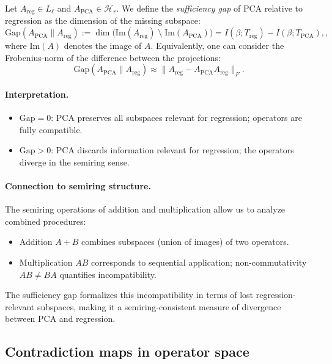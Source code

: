 \begin{defn}  
Let $A_{\text{reg}} \in L_\ell$ and $A_{\text{PCA}} \in \mathcal{H}_r$. 
We define the \emph{sufficiency gap} of PCA relative to regression as the dimension of the missing subspace:
\[
\text{Gap}(A_{\text{PCA}} \parallel A_{\text{reg}}) 
:= \dim \Big( \mathrm{Im}(A_{\text{reg}}) \;\setminus\; \mathrm{Im}(A_{\text{PCA}}) \Big) = I(\beta; T_{\text{reg}}) - I(\beta; T_{\text{PCA}}),,
\]
where $\mathrm{Im}(A)$ denotes the image of $A$.  
Equivalently, one can consider the Frobenius-norm of the difference between the projections:
\[
\text{Gap}(A_{\text{PCA}} \parallel A_{\text{reg}}) 
\approx \| A_{\text{reg}} - A_{\text{PCA}} A_{\text{reg}} \|_F.
\]
\end{defn}

\paragraph{Interpretation.}  
\begin{itemize}
    \item $\text{Gap} = 0$: PCA preserves all subspaces relevant for regression; operators are fully compatible.
    \item $\text{Gap} > 0$: PCA discards information relevant for regression; the operators diverge in the semiring sense.
\end{itemize}

\paragraph{Connection to semiring structure.}  
The semiring operations of addition and multiplication allow us to analyze combined procedures:
\begin{itemize}
    \item Addition $A + B$ combines subspaces (union of images) of two operators.
    \item Multiplication $AB$ corresponds to sequential application; non-commutativity $AB \neq BA$ quantifies incompatibility.
\end{itemize}
The sufficiency gap formalizes this incompatibility in terms of lost regression-relevant subspaces, making it a semiring-consistent measure of divergence between PCA and regression.
\subsection{Contradiction maps in operator space}

